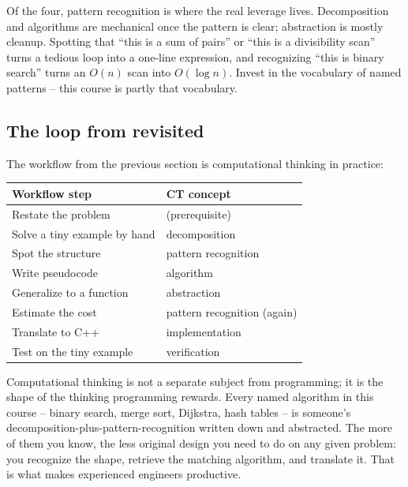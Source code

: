 \documentclass[11pt]{article}
\begin{document}
\begin{ideabox}
Of the four, pattern recognition is where the real leverage lives.
Decomposition and algorithms are mechanical once the pattern is
clear; abstraction is mostly cleanup. Spotting that ``this is a
sum of pairs'' or ``this is a divisibility scan'' turns a tedious
loop into a one-line expression, and recognizing ``this is binary
search'' turns an $O(n)$ scan into $O(\log n)$. Invest in the
vocabulary of named patterns -- this course is partly that vocabulary.
\end{ideabox}

\subsection{The loop from  revisited}

The workflow from the previous section is computational thinking in
practice:

\begin{center}
\small
\begin{tabular}{ll}
\textbf{Workflow step} & \textbf{CT concept} \\
\hline
Restate the problem & (prerequisite) \\
Solve a tiny example by hand & decomposition \\
Spot the structure & pattern recognition \\
Write pseudocode & algorithm \\
Generalize to a function & abstraction \\
Estimate the cost & pattern recognition (again) \\
Translate to C++ & implementation \\
Test on the tiny example & verification \\
\end{tabular}
\normalsize
\end{center}

\begin{ideabox}
Computational thinking is not a separate subject from programming; it
is the shape of the thinking programming rewards. Every named
algorithm in this course -- binary search, merge sort, Dijkstra, hash
tables -- is someone's decomposition-plus-pattern-recognition written
down and abstracted. The more of them you know, the less original
design you need to do on any given problem: you recognize the shape,
retrieve the matching algorithm, and translate it. That is what makes
experienced engineers productive.
\end{ideabox}
\end{document}
